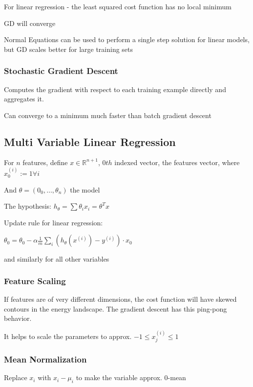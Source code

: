 For linear regression - the least squared cost function has no local minimum

GD will converge 

Normal Equations can be used to perform a single step solution for linear models, but GD scales better for large training sets

\subsubsection{Stochastic Gradient Descent}

Computes the gradient with respect to each training example directly and aggregates it. 

Can  converge to a minimum much faster than batch gradient descent 

\subsection{Multi Variable Linear Regression}

For $n$ features, define $ x\in\mathbb{R}^{n+1}$, $0th$ indexed vector,  the features vector, where $x_0^{(i)} := 1 \forall i$  

And $\theta = (0_0,\dots,\theta_n)$  the model

The hypothesis: $h_{\theta} = \sum \theta_i x_i = \theta^T x$  

Update rule for linear regression:

$\theta_0 = \theta_0 -\alpha\frac{1}{m}\sum_i (h_\theta(x^{(i)})-y^{(i)})\cdot x_0$

and similarly for all other variables

\subsubsection{Feature Scaling}

If features are of very different dimensions, the cost function will have skewed contours in the energy landscape. The gradient descent has this ping-pong behavior.  

It helps to scale the parameters to approx. $-1 \le x_j^{(i)}\le 1$

\subsubsection{Mean Normalization}

Replace $x_i$ with $x_i - \mu_i$ to make the variable approx. 0-mean

